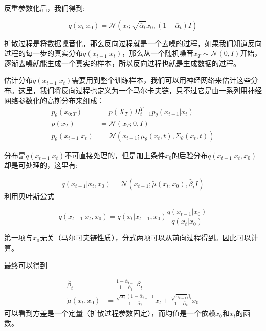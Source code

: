 反重参数化后，我们得到:

\begin{equation}\label{eqn-14}
      q(x_t|x_{0})=\mathcal{N}(x_t;\sqrt{\overline{\alpha}_t}x_{0},(1-\overline{\alpha}_t)I)
\end{equation}

扩散过程是将数据噪音化，那么反向过程就是一个去噪的过程，如果我们知道反向过程的每一步的真实分布$q(x_{t-1}|x_t)$，那么从一个随机噪音$x_T \sim \mathcal{N}(0,I)$开始，逐渐去噪就能生成一个真实的样本，所以反向过程也就是生成数据的过程。

估计分布$q(x_{t-1}|x_t)$需要用到整个训练样本，我们可以用神经网络来估计这些分布。这里，我们将反向过程也定义为一个马尔卡夫链，只不过它是由一系列用神经网络参数化的高斯分布来组成：
$$\begin{aligned}
      p_{\theta}(x_{0:T}) &= p(X_T)\Pi^T_{t=1}{p_{\theta}(x_{t-1}|x_t)} \\
      p(x_T) &= \mathcal{N}(x_T;0,I)\\
      p_{\theta}(x_{t-1}|x_t) &= \mathcal{N}(x_{t-1};\mu_{\theta}(x_t,t),\Sigma_{\theta}(x_t,t))
\end{aligned}$$

分布是$q(x_{t-1}|x_t)$不可直接处理的，但是加上条件$x_0$的后验分布$q(x_{t-1}|x_t,x_0)$却是可处理的，这里有:

\begin{equation}\label{eqn-15}
      q(x_{t-1}|x_t,x_0) = \mathcal{N}(x_{t-1};\widetilde{\mu}(x_t,x_0),\widetilde{\beta_t}I)
\end{equation}
利用贝叶斯公式

\begin{equation}\label{eqn-16}
      q(x_{t-1}|x_t,x_0) = q(x_{t}|x_{t-1},x_0)\frac{q(x_{t-1}|x_0)}{q(x_{t}|x_0)}
\end{equation}

第一项与$x_0$无关（马尔可夫链性质），分式两项可以从前向过程得到。因此可以计算。

最终可以得到

$$\begin{aligned}
\widetilde{\beta_t} &= \frac{1 - \overline{\alpha}_{t-1}}{1 - \overline{\alpha}_{t}}\beta_t \\
\widetilde{\mu}(x_t,x_0) &= \frac{\sqrt{\alpha_t}(1- \overline{\alpha}_{t-1})}{1- \overline{\alpha}_{t}}x_t + \frac{\sqrt{\overline{\alpha}_{t-1}}\beta_t}{1- \overline{\alpha}_{t}}x_0
\end{aligned}$$
可以看到方差是一个定量（扩散过程参数固定），而均值是一个依赖$x_0$和$x_t$的函数。

